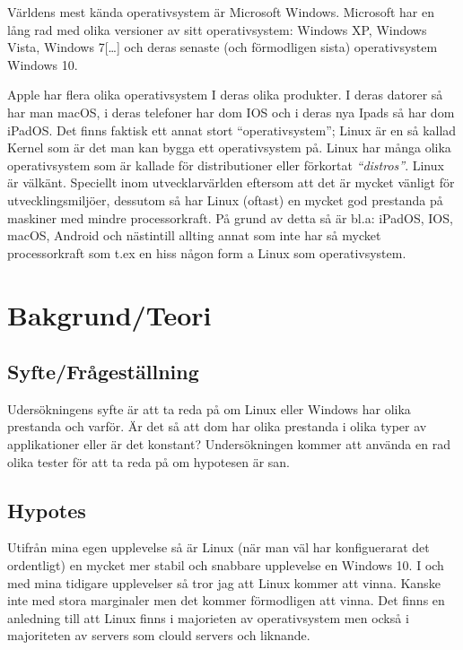\documentclass[12pt, a4paper]{report}
\begin{document}
   Världens mest kända operativsystem\cite{winstat} är Microsoft Windows. Microsoft har en lång rad med olika versioner av sitt operativsystem\cite{windows}: Windows XP, Windows Vista, Windows 7[\dots] och deras senaste (och förmodligen sista) operativsystem Windows 10.
    
   Apple har flera olika operativsystem\cite{appleOS} I deras olika produkter. I deras datorer så har man macOS, i deras telefoner har dom IOS och i deras nya Ipads så har dom iPadOS.
    Det finns faktisk ett annat stort ``operativsystem''; Linux är en så kallad Kernel \cite{redhat} som är det man kan bygga ett operativsystem på. Linux har många olika operativsystem som är kallade för distributioner eller förkortat \textit{``distros''}. Linux är välkänt. Speciellt inom utvecklarvärlden eftersom att det är mycket vänligt för utvecklingsmiljöer, dessutom så har Linux (oftast) en mycket god prestanda på maskiner med mindre processorkraft\cite{whatislinux}. På grund av detta så är bl.a: iPadOS, IOS, macOS, Android och nästintill allting annat som inte har så mycket processorkraft som t.ex en hiss någon form a Linux som operativsystem.
    
\section{Bakgrund/Teori}


    \subsection{Syfte/Frågeställning}
    Udersökningens syfte är att ta reda på om Linux eller Windows har olika prestanda och varför. Är det så att dom har olika prestanda i olika typer av applikationer eller är det konstant? Undersökningen kommer att använda en rad olika tester för att ta reda på om hypotesen är san.
 

    \subsection{Hypotes}

    Utifrån mina egen upplevelse så är Linux (när man väl har konfiguerarat det ordentligt) en mycket mer stabil och snabbare upplevelse en Windows 10. I och med mina tidigare upplevelser så tror jag att Linux kommer att vinna. Kanske inte med stora marginaler men det kommer förmodligen att vinna.
    Det finns en anledning till att Linux finns i majorieten av operativsystem men också i majoriteten av servers som clould servers och liknande.
 
\end{document}
